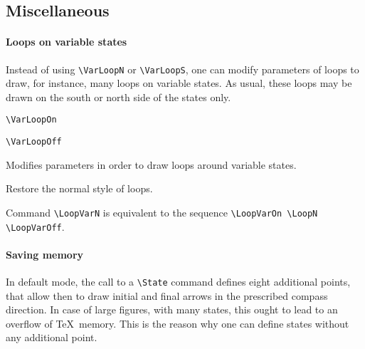 \documentclass[11pt,twoside]{article}
\newlength{\ColoText}%
\newlength{\ColoFigu}%
\newlength{\parindenttemp} %
\newcommand{\noi}{\noindent}
\newlength{\jsIndent}%
\begin{document}
\subsection{Miscellaneous}


\paragraph{Loops on variable states}
Instead of using \verb+\VarLoopN+ or \verb+\VarLoopS+, one can modify
parameters of loops to draw, for instance, many loops on variable states.
As usual, these loops may be drawn on the south or north side of
the states only.

\noi 
\hspace*{-\jsIndent}
\begin{minipage}[t]{\ColoText}
        \par\vspace*{0mm}%
        \footnotesize
\verb+\VarLoopOn+
   
\medskip 
\verb+\VarLoopOff+

\medskip 
\end{minipage}%
\hspace*{1.2em}%
\begin{minipage}[t]{\ColoFigu}%
\par\vspace*{0mm}%
Modifies parameters in order to draw loops around variable states.

\smallskip 

Restore the normal style of loops.
\end{minipage}%

\noi
Command \verb+\LoopVarN+ is equivalent to the sequence
\verb+\LoopVarOn \LoopN \LoopVarOff+.

\paragraph{Saving memory}

In default mode, the call to a \verb+\State+ command 
defines eight additional points, that allow then to draw initial and 
final arrows in the prescribed compass direction.
In case of large figures, with many states, this ought to lead
to an overflow of \TeX\   memory. This is the reason why one can define
states without any additional point.
\end{document}
